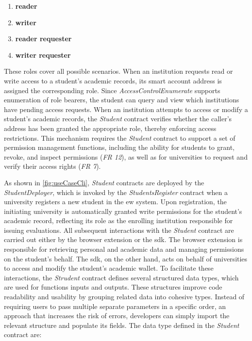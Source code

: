 \begin{enumerate}
    \item \textbf{reader}
    \item \textbf{writer}
    \item \textbf{reader requester}
    \item \textbf{writer requester}
\end{enumerate}
These roles cover all possible scenarios. When an institution requests read or write access to a student's academic records,  its smart account address is assigned the corresponding role. Since \textit{AccessControlEnumerate} supports enumeration of role bearers, the student can query and view which institutions have pending access requests. When an institution attempts to access or modify a student's academic records, the \textit{Student} contract verifies whether the caller's address has been granted the appropriate role, thereby enforcing access restrictions. This mechanism requires the \textit{Student} contract to support a set of permission management functions, including the ability for students to grant, revoke, and inspect permissions (\textit{FR 12}), as well as for universities to request and verify their access rights (\textit{FR 7}).

As shown in \cref{fig:useCaseCli}, \textit{Student} contracts are deployed by the \textit{StudentDeployer}, which is invoked by the \textit{StudentsRegister} contract when a university registers a new student in the \acrshort{ew} system. Upon registration, the initiating university is automatically granted write permissions for the student's academic record, reflecting its role as the enrolling institution responsible for issuing evaluations. All subsequent interactions with the \textit{Student} contract are carried out either by the browser extension or the \acrshort{sdk}. The browser extension is responsible for retrieving personal and academic data and managing permissions on the student's behalf. The \acrshort{sdk}, on the other hand, acts on behalf of universities to access and modify the student's academic wallet. To facilitate these interactions, the \textit{Strudent} contract defines several structured data types, which are used for functions inputs and outputs. These structures improve code readability and usability by grouping related data into cohesive types. Instead of requiring users to  pass multiple separate parameters in a specific order, an approach that increases the risk of errors, developers can simply import the relevant structure and populate its fields. The data type defined in the \textit{Student} contract are:

